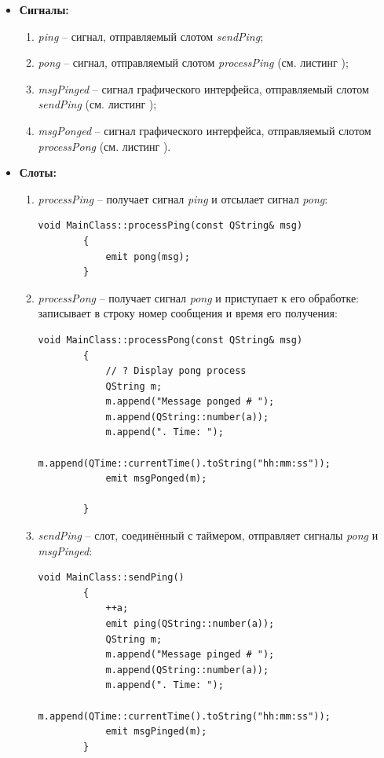 \documentclass[../AISTR.tex]{subfiles}
\begin{document}
\begin{itemize}
	\item \textbf{Сигналы:}
	\begin{enumerate}
		\item \textit{ping} -- сигнал, отправляемый слотом \textit{sendPing};
		\item \textit{pong} -- сигнал, отправляемый слотом \textit{processPing} (см. листинг );
		\item \textit{msgPinged} -- сигнал графического интерфейса, отправляемый слотом \textit{sendPing} (см. листинг );
		\item \textit{msgPonged} -- сигнал графического интерфейса, отправляемый слотом \textit{processPong} (см. листинг ).
	\end{enumerate}
	\item \textbf{Слоты:}
	\begin{enumerate}
		\item \textit{processPing} -- получает сигнал \textit{ping} и отсылает сигнал \textit{pong}:
		
		\begin{lstlisting}[caption=Реализация слота processPing,captionpos=b, label={list:slot_processPing}]
		void MainClass::processPing(const QString& msg)
		{
			emit pong(msg);
		}				
		\end{lstlisting}	
		\item \textit{processPong} -- получает сигнал \textit{pong} и приступает к его обработке: записывает в строку номер сообщения и время его получения:
		\begin{lstlisting}[caption=Реализация слота processPong,captionpos=b, label={list:slot_processPong}]
		void MainClass::processPong(const QString& msg)
		{
			// ? Display pong process
			QString m;
			m.append("Message ponged # ");
			m.append(QString::number(a));
			m.append(". Time: ");
			m.append(QTime::currentTime().toString("hh:mm:ss"));
			emit msgPonged(m);
			
		}			
		\end{lstlisting}
		\item \textit{sendPing} -- слот, соединённый с таймером, отправляет сигналы \textit{pong} и \textit{msgPinged}:
		\begin{lstlisting}[caption=Реализация слота sendPing,captionpos=b, label={list:slot_sendPing}]
		void MainClass::sendPing()
		{
			++a;
			emit ping(QString::number(a));
			QString m;
			m.append("Message pinged # ");
			m.append(QString::number(a));
			m.append(". Time: ");
			m.append(QTime::currentTime().toString("hh:mm:ss"));
			emit msgPinged(m);
		}
		\end{lstlisting}
	\end{enumerate}
\end{itemize}
\end{document}
